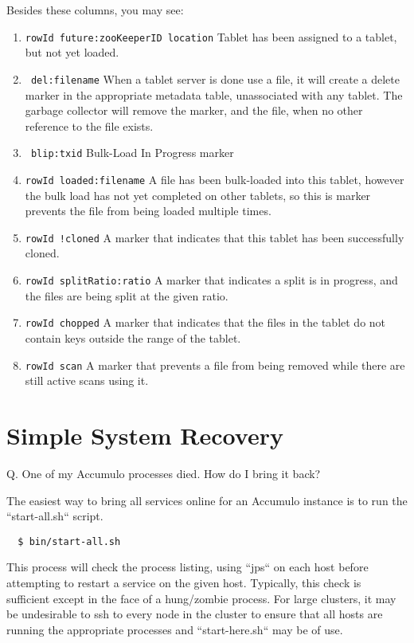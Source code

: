 Besides these columns, you may see:

\begin{enumerate}
\item{\texttt{rowId future:zooKeeperID location} Tablet has been assigned to a tablet, but not yet loaded.}
\item{\texttt{~del:filename} When a tablet server is done use a file, it will create a delete marker in the appropriate metadata table, unassociated with any tablet.  The garbage collector will remove the marker, and the file, when no other reference to the file exists.}
\item{\texttt{~blip:txid} Bulk-Load In Progress marker}
\item{\texttt{rowId loaded:filename} A file has been bulk-loaded into this tablet, however the bulk load has not yet completed on other tablets, so this is marker prevents the file from being loaded multiple times.}
\item{\texttt{rowId !cloned} A marker that indicates that this tablet has been successfully cloned.}
\item{\texttt{rowId splitRatio:ratio} A marker that indicates a split is in progress, and the files are being split at the given ratio.}
\item{\texttt{rowId chopped} A marker that indicates that the files in the tablet do not contain keys outside the range of the tablet.}
\item{\texttt{rowId scan} A marker that prevents a file from being removed while there are still active scans using it.}

\end{enumerate}

\section{Simple System Recovery}

Q. One of my Accumulo processes died. How do I bring it back?

The easiest way to bring all services online for an Accumulo instance is to run the ``start-all.sh`` script.

\small
\begin{verbatim}
  $ bin/start-all.sh
\end{verbatim}
\normalsize

This process will check the process listing, using ``jps`` on each host before attempting to restart a service on the given host.
Typically, this check is sufficient except in the face of a hung/zombie process. For large clusters, it may be
undesirable to ssh to every node in the cluster to ensure that all hosts are running the appropriate processes and ``start-here.sh`` may be of use.

